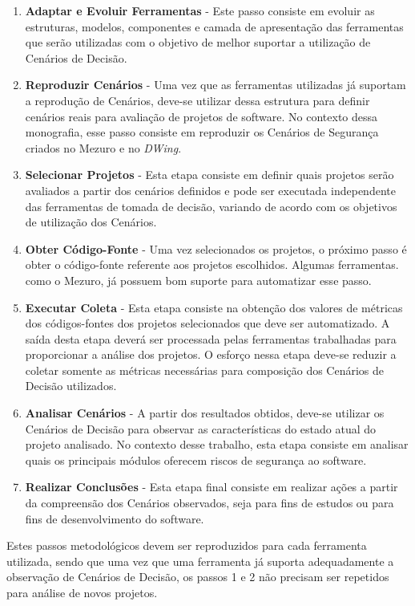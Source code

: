 \begin{enumerate}
\item \textbf{Adaptar e Evoluir Ferramentas} - Este passo consiste em evoluir as estruturas, modelos, componentes e camada de apresentação das ferramentas que serão utilizadas com o objetivo de melhor suportar a utilização de Cenários de Decisão.
\item \textbf{Reproduzir Cenários} - Uma vez que as ferramentas utilizadas já suportam a reprodução de Cenários, deve-se utilizar dessa estrutura para definir cenários reais para avaliação de projetos de software. No contexto dessa monografia, esse passo consiste em reproduzir os Cenários de Segurança criados no Mezuro e no \emph{DWing}.
\item \textbf{Selecionar Projetos} - Esta etapa consiste em definir quais projetos serão avaliados a partir dos cenários definidos e pode ser executada independente das ferramentas de tomada de decisão, variando de acordo com os objetivos de utilização dos Cenários.
\item \textbf{Obter Código-Fonte} - Uma vez selecionados os projetos, o próximo passo é obter o código-fonte referente aos projetos escolhidos. Algumas ferramentas. como o Mezuro, já possuem bom suporte para automatizar esse passo.
\item \textbf{Executar Coleta} - Esta etapa consiste na obtenção dos valores de métricas dos códigos-fontes dos projetos selecionados que deve ser automatizado. A saída desta etapa deverá ser processada pelas ferramentas trabalhadas para proporcionar a análise dos projetos. O esforço nessa etapa deve-se reduzir a coletar somente as métricas necessárias para composição dos Cenários de Decisão utilizados.
\item \textbf{Analisar Cenários} - A partir dos resultados obtidos, deve-se utilizar os Cenários de Decisão para observar as características do estado atual do projeto analisado. No contexto desse trabalho, esta etapa consiste em analisar quais os principais módulos oferecem riscos de segurança ao software.
\item \textbf{Realizar Conclusões} - Esta etapa final consiste em realizar ações a partir da compreensão dos Cenários observados, seja para fins de estudos ou para fins de desenvolvimento do software. 
\end{enumerate}


Estes passos metodológicos devem ser reproduzidos para cada ferramenta utilizada, sendo que uma vez que uma ferramenta já suporta adequadamente a observação de Cenários de Decisão, os passos 1 e 2 não precisam ser repetidos para análise de novos projetos.



